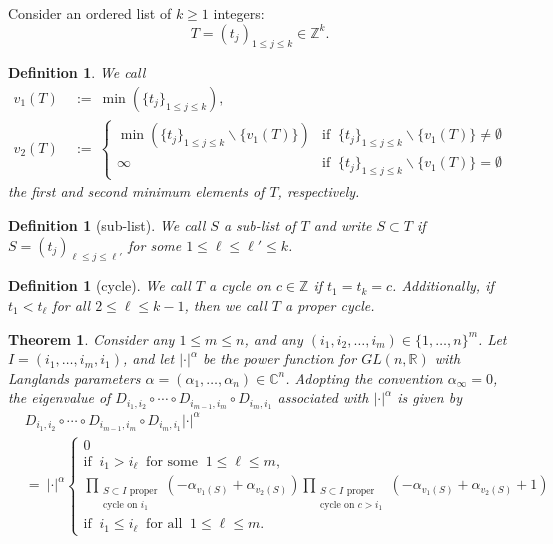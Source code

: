 \documentclass[12pt, reqno, oneside]{amsart}
\newtheorem{definition}[corollary]{Definition}
\newtheorem{theorem}[corollary]{Theorem}
\numberwithin{equation}{section}
\begin{document}
Consider an ordered list of $k \geq 1$ integers: 
\begin{equation*}
T = (t_j)_{1 \leq j \leq k} \in \mathbb{Z}^k.    
\end{equation*}

\begin{definition}
We call 
\begin{align}
v_1(T) \ &:= \ \min\left(\{t_j\}_{1 \leq j \leq k}\right), \\
v_2(T) \ &:= \ 
\begin{cases}
\min\left(\{t_j\}_{1 \leq j \leq k} \backslash \{v_1(T)\}\right) & \text{if } \ \{t_j\}_{1 \leq j \leq k} \backslash \{v_1(T)\} \neq \emptyset \\
\infty & \text{if } \ \{t_j\}_{1 \leq j \leq k} \backslash \{v_1(T)\} = \emptyset 
\end{cases}
\end{align}
the first and second minimum elements of $T$, respectively. 
\end{definition}

\begin{definition}[sub-list]
We call $S$ a sub-list of $T$ and write $S \subset T$ if $S = (t_j)_{\ell \leq j \leq \ell'}$ for some $1 \leq \ell \leq \ell' \leq k$.
\end{definition}

\begin{definition}[cycle]\label{def:cycle}
We call $T$ a cycle on $c \in \mathbb{Z}$ if $t_1 = t_k =c$. Additionally, if $t_1 < t_\ell$ for all $2 \leq \ell \leq k-1$, then we call $T$ a proper cycle. 
\end{definition}

\begin{theorem}\label{thm:elementary-differential-operator}
Consider any $1 \leq m \leq n$, and any $(i_1, i_2, \dots, i_m) \in \{1, \dots, n\}^m$. Let $I = (i_1, \dots, i_m, i_1)$, and let $|\cdot|^\alpha$ be the power function for $GL(n,\mathbb{R})$ with Langlands parameters $\alpha = (\alpha_1,\dots,\alpha_{n}) \in \mathbb{C}^n$. Adopting the convention $\alpha_\infty = 0$, the eigenvalue of $D_{i_1,i_2} \circ \cdots \circ D_{i_{m-1},i_m} \circ D_{i_m,i_1}$ associated with $|\cdot|^\alpha$ is given by
\begin{align}\label{eq:elementary-eigenvalue}
\nonumber
& D_{i_1,i_2} \circ \cdots \circ D_{i_{m-1},i_m} \circ D_{i_m,i_1} |\cdot|^\alpha \\
& = \ |\cdot|^\alpha
\begin{cases}
0 \\
\text{if } \ i_1 > i_\ell \ \text{ for some } \ 1 \leq \ell \leq m, \\
\prod\limits_{\substack{S \subset I \text{ proper} \\ \text{cycle on } i_1}}\left(-\alpha_{v_1(S)}+\alpha_{v_2(S)}\right)\prod\limits_{\substack{S \subset I \text{ proper} \\ \text{cycle on } c > i_1}}\left(-\alpha_{v_1(S)}+\alpha_{v_2(S)} + 1\right) \\
\text{if } \ i_1 \leq i_\ell \ \text{ for all } \ 1 \leq \ell \leq m.
\end{cases} 
\end{align}
\end{theorem}
\end{document}
